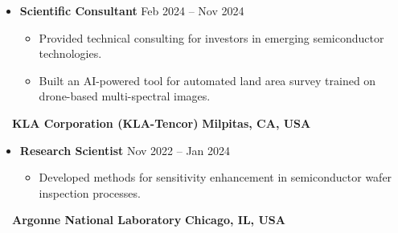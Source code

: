 \documentclass[10.5pt]{article}
\begin{document}
\begin{itemize}
    \item
        \textbf{Scientific Consultant}
        \hfill  {Feb 2024 -- Nov 2024} \par
        \begin{itemize}
            \item Provided technical consulting for investors in emerging semiconductor technologies. 
            \item Built an AI-powered tool for automated land area survey trained on drone-based multi-spectral images. 
        \end{itemize}
\end{itemize} ~~{\color{black}\textbf{KLA Corporation (KLA-Tencor)} \hfill  \textbf{Milpitas, CA, USA}}\par
\begin{itemize}
    \item
        \textbf{Research Scientist}
        \hfill  {Nov 2022 -- Jan 2024} \par
        \begin{itemize}
            \item Developed methods for sensitivity enhancement in semiconductor wafer inspection processes. 
        \end{itemize}
\end{itemize} ~~{\color{black}\textbf{Argonne National Laboratory} \hfill  \textbf{Chicago, IL, USA}}\par
\end{document}
